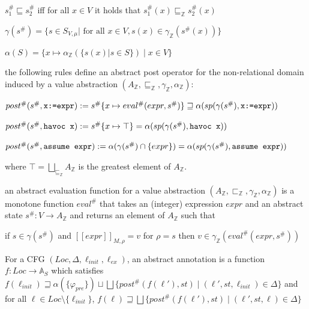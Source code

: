 \documentclass[landscape, a4paper]{article}
\begin{document}
\begin{minipage}[t]{0.2\linewidth}
\begin{betterlist}
\begin{betterlist}
			\item $s^\#_1 \sqsubseteq s^\#_2$ iff for all $x \in V$ it holds that $s^\#_1(x) \sqsubseteq_{\mathbb{Z}} s^\#_2(x)$
			\item $\gamma(s^\#) = \{s \in S_{V ,\mu} | \text{ for all } x \in V, s(x) \in \gamma_{\mathbb{Z}}(s^\#(x))\}$
			\item $\alpha(S) = \{x \mapsto \alpha_{\mathbb{Z}}(\{s(x) | s \in S\}) \mid x \in V\}$
			\item {}
			\item the following rules define an abstract post operator for the non-relational domain induced by a value abstraction $(A_{\mathbb{Z}}, \sqsubseteq_{\mathbb{Z}}, \gamma_{\mathbb{Z}}, \alpha_{\mathbb{Z}})$:
			\begin{betterlist}
				\item $post^\#(s^\#, \verb|x:=expr|) := s^\#\{x \mapsto eval^\#(expr, s^\#)\} \sqsupseteq \alpha(sp(\gamma(s^\#), \verb|x:=expr|))$
				\item $post^\#(s^\#, \verb|havoc x|) := s^\#\{x \mapsto \top\} = \alpha(sp(\gamma(s^\#), \verb|havoc x|))$
				\item $post^\#(s^\#, \verb|assume expr|) := \alpha(\gamma(s^\#) \cap \{expr\}) = \alpha(sp(\gamma(s^\#), \verb|assume expr|))$
			\end{betterlist}
			where $\top= \bigsqcup_{\sqsubseteq_{\mathbb{Z}}} A_{\mathbb{Z}}$ is the greatest element of $A_{\mathbb{Z}}$. 
		\end{betterlist}\color{black}
		\item \color{orange}an \alert{abstract evaluation function} for a value abstraction $(A_{\mathbb{Z}}, \sqsubset_{\mathbb{Z}}, \gamma_{\mathbb{Z}}, \alpha_{\mathbb{Z}})$ is a monotone function $eval^\#$ that takes an (integer) expression $expr$ and an abstract state $s^\#: V \rightarrow A_{\mathbb{Z}}$ and returns an element of $A_{\mathbb{Z}}$ such that
		\begin{betterlist}
			\item if $s \in \gamma(s^\#)$ and $[[expr]]_{M,\rho} = v$ for $\rho = s$ then $v \in \gamma_{\mathbb{Z}}(eval^\#(expr, s^\#))$
		\end{betterlist}\color{black}
		\item \color{orange}For a CFG $(Loc, \Delta, \ell_{init}, \ell_{ex})$, an \alert{abstract annotation} is a function $f: Loc \rightarrow \mathbb{A}_S$ which satisfies $f(\ell_{init}) \sqsupseteq \alpha(\{\varphi_{pre}\}) \sqcup \bigsqcup \{post^\#(f(\ell'), st) \mid (\ell′, st, \ell_{init}) \in \Delta\}$ and for all $\ell \in Loc \setminus \{\ell_{init}\}$, $f(\ell) \sqsupseteq \bigsqcup \{post^\#(f(\ell'), st) \mid (\ell', st, \ell) \in \Delta\}$\color{black}

\end{betterlist}
\end{minipage}
\end{document}
